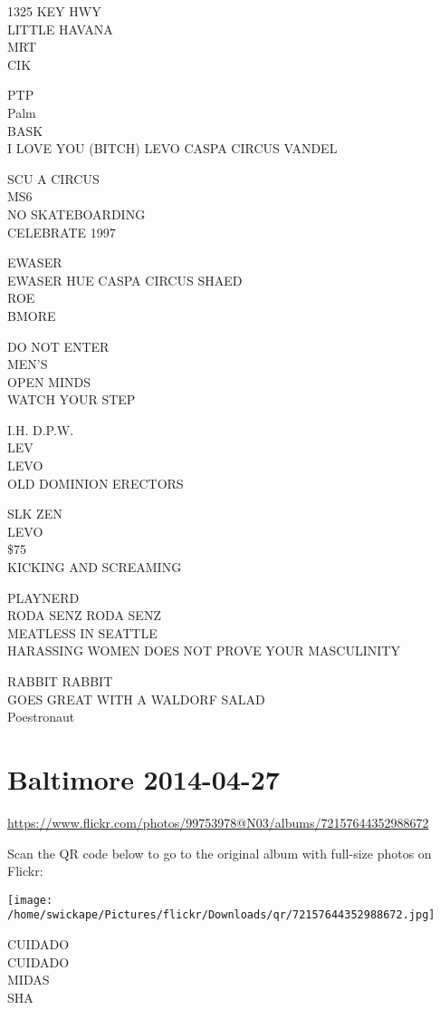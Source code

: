 \documentclass[10pt,letterpaper]{article}
\begin{document}
1325 KEY HWY\\
LITTLE HAVANA\\
MRT\\
CIK

PTP\\
Palm\\
BASK\\
I LOVE YOU (BITCH) LEVO CASPA CIRCUS VANDEL

SCU A CIRCUS\\
MS6\\
NO SKATEBOARDING\\
CELEBRATE 1997

EWASER\\
EWASER HUE CASPA CIRCUS SHAED\\
ROE\\
BMORE

DO NOT ENTER\\
MEN'S\\
OPEN MINDS\\
WATCH YOUR STEP

I.H. D.P.W.\\
LEV\\
LEVO\\
OLD DOMINION ERECTORS

SLK ZEN\\
LEVO\\
\$75\\
KICKING AND SCREAMING

PLAYNERD\\
RODA SENZ RODA SENZ\\
MEATLESS IN SEATTLE\\
HARASSING WOMEN DOES NOT PROVE YOUR MASCULINITY

RABBIT RABBIT\\
GOES GREAT WITH A WALDORF SALAD\\
Poestronaut


\section*{Baltimore 2014-04-27}

\url{https://www.flickr.com/photos/99753978@N03/albums/72157644352988672}

Scan the QR code below to go to the original album with full-size photos on Flickr:

\texttt{[image: /home/swickape/Pictures/flickr/Downloads/qr/72157644352988672.jpg]}


CUIDADO\\
CUIDADO\\
MIDAS\\
SHA
\end{document}
